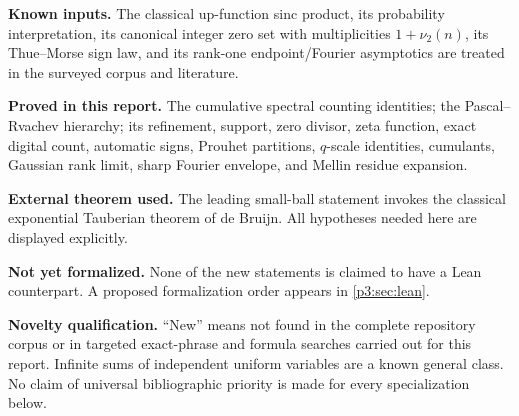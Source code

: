 \documentclass[11pt,oneside]{article}
\theoremstyle{definition}
\theoremstyle{remark}
\begin{document}
\begin{abstract}
The same hierarchy has cumulants
\[
 \kappa_{2k}(X_r)=\frac{B_{2k}}{2k}\frac{2^{2k}}{(2^{2k}-1)^r},
 \qquad \Var(X_r)=3^{-(r+1)}.
\]
After variance normalization it converges to the standard Gaussian, with an exponential Berry--Esseen bound.  Its Fourier envelope obeys the sharp law
\[
 \limsup_{|x|\to\infty}\frac{\log|\Phi_r(x)|}{(\log|x|)^{r+1}}
 =-\frac{1}{(r+1)!(\log2)^r}.
\]
Finally, the left-endpoint Laplace exponent admits a Mellin representation whose poles are exactly the same dyadic lattice that appears in $\mathcal Z_r$.  The pole at zero supplies a degree-$(r+1)$ logarithmic polynomial, the nonzero lattice poles supply degree-$(r-1)$ periodic polynomials, and the leading saddle is solved by the lower branch $W_{-1}$ of Lambert's function.  Complete proofs are given for the exact algebraic, digital, probabilistic, Fourier, and Mellin statements.  The final endpoint transseries beyond leading Tauberian order is isolated as a conjectural program rather than asserted.
\end{abstract}

\begin{statusbox}
\textbf{Known inputs.}  The classical up-function sinc product, its probability interpretation, its canonical integer zero set with multiplicities $1+\nu_2(n)$, its Thue--Morse sign law, and its rank-one endpoint/Fourier asymptotics are treated in the surveyed corpus and literature.

\textbf{Proved in this report.}  The cumulative spectral counting identities; the Pascal--Rvachev hierarchy; its refinement, support, zero divisor, zeta function, exact digital count, automatic signs, Prouhet partitions, $q$-scale identities, cumulants, Gaussian rank limit, sharp Fourier envelope, and Mellin residue expansion.

\textbf{External theorem used.}  The leading small-ball statement invokes the classical exponential Tauberian theorem of de Bruijn.  All hypotheses needed here are displayed explicitly.

\textbf{Not yet formalized.}  None of the new statements is claimed to have a Lean counterpart.  A proposed formalization order appears in \cref{p3:sec:lean}.

\textbf{Novelty qualification.}  ``New'' means not found in the complete repository corpus or in targeted exact-phrase and formula searches carried out for this report.  Infinite sums of independent uniform variables are a known general class.  No claim of universal bibliographic priority is made for every specialization below.
\end{statusbox}
\end{document}
